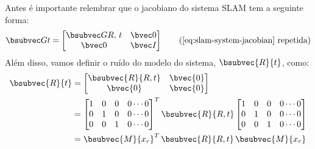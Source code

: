 Antes é importante relembrar que o jacobiano do sistema SLAM tem a seguinte 
forma:
\begin{equation*}
  \slamsystemjacobian \tag{\ref{eq:slam-system-jacobian} repetida}
\end{equation*}
Além disso, vamos definir o ruído do modelo do sistema, $\bsubvec{R}{t}$, como:
\begin{equation}
\begin{aligned}
\bsubvec{R}{t} &= \begin{bmatrix}
  \bsubvec{R}{R, t} & \bvec{0} \\
  \bvec{0} & \bvec{0} \\
  \end{bmatrix}\\
  &= \begin{bmatrix}
    1 & 0 & 0 & 0 \cdots 0 \\
    0 & 1 & 0 & 0 \cdots 0 \\
    0 & 0 & 1 & 0 \cdots 0
  \end{bmatrix}^T \bsubvec{R}{R, t}
  \begin{bmatrix}
    1 & 0 & 0 & 0 \cdots 0 \\
    0 & 1 & 0 & 0 \cdots 0 \\
    0 & 0 & 1 & 0 \cdots 0
  \end{bmatrix} \\
  &= \bsubvec{M}{x_r}^T \, \bsubvec{R}{R, t} \, \bsubvec{M}{x_r}
\end{aligned}
\label{eq:slam-system-error}
\end{equation}

